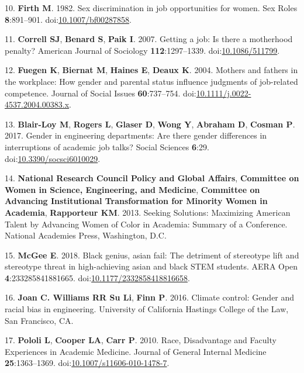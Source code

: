 \documentclass[10pt,]{article}
\begin{document}
\hypertarget{ref-Firth1982}{}
10. \textbf{Firth M}. 1982. Sex discrimination in job opportunities for
women. Sex Roles \textbf{8}:891--901.
doi:\href{https://doi.org/10.1007/bf00287858}{10.1007/bf00287858}.

\hypertarget{ref-Correll2007}{}
11. \textbf{Correll SJ}, \textbf{Benard S}, \textbf{Paik I}. 2007.
Getting a job: Is there a motherhood penalty? American Journal of
Sociology \textbf{112}:1297--1339.
doi:\href{https://doi.org/10.1086/511799}{10.1086/511799}.

\hypertarget{ref-Fuegen2004}{}
12. \textbf{Fuegen K}, \textbf{Biernat M}, \textbf{Haines E},
\textbf{Deaux K}. 2004. Mothers and fathers in the workplace: How gender
and parental status influence judgments of job-related competence.
Journal of Social Issues \textbf{60}:737--754.
doi:\href{https://doi.org/10.1111/j.0022-4537.2004.00383.x}{10.1111/j.0022-4537.2004.00383.x}.

\hypertarget{ref-BlairLoy2017}{}
13. \textbf{Blair-Loy M}, \textbf{Rogers L}, \textbf{Glaser D},
\textbf{Wong Y}, \textbf{Abraham D}, \textbf{Cosman P}. 2017. Gender in
engineering departments: Are there gender differences in interruptions
of academic job talks? Social Sciences \textbf{6}:29.
doi:\href{https://doi.org/10.3390/socsci6010029}{10.3390/socsci6010029}.

\hypertarget{ref-noauthor_seeking_2013}{}
14. \textbf{National Research Council \textnormal{Policy and Global
Affairs}}, \textbf{Committee on Women in Science, Engineering, and
Medicine}, \textbf{Committee on Advancing Institutional Transformation
for Minority Women in Academia}, \textbf{Rapporteur KM}. 2013. Seeking
Solutions: Maximizing American Talent by Advancing Women of Color in
Academia: Summary of a Conference. National Academies Press, Washington,
D.C.

\hypertarget{ref-McGee2018}{}
15. \textbf{McGee E}. 2018. Black genius, asian fail: The detriment of
stereotype lift and stereotype threat in high-achieving asian and black
STEM students. AERA Open \textbf{4}:233285841881665.
doi:\href{https://doi.org/10.1177/2332858418816658}{10.1177/2332858418816658}.

\hypertarget{ref-wse_2016}{}
16. \textbf{Joan C. Williams RR \textnormal{Su Li}}, \textbf{Finn P}.
2016. Climate control: Gender and racial bias in engineering. University
of California Hastings College of the Law, San Francisco, CA.

\hypertarget{ref-pololi_race_2010}{}
17. \textbf{Pololi L}, \textbf{Cooper LA}, \textbf{Carr P}. 2010. Race,
Disadvantage and Faculty Experiences in Academic Medicine. Journal of
General Internal Medicine \textbf{25}:1363--1369.
doi:\href{https://doi.org/10.1007/s11606-010-1478-7}{10.1007/s11606-010-1478-7}.
\end{document}
